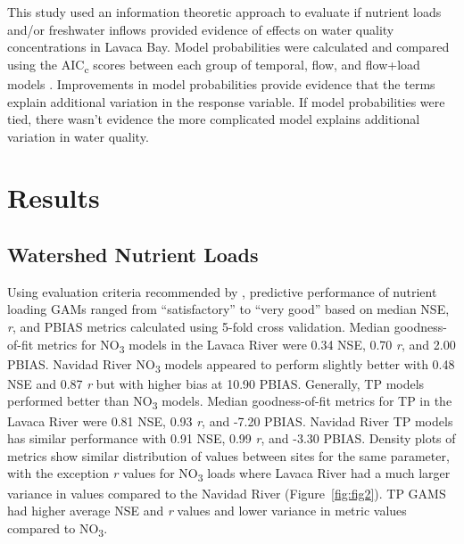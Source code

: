 \documentclass[sn-basic,referee,lineno,pdflatex]{sn-jnl}
\begin{document}
This study used an information theoretic approach to evaluate if
nutrient loads and/or freshwater inflows provided evidence of effects on
water quality concentrations in Lavaca Bay. Model probabilities were
calculated and compared using the AIC\textsubscript{c} scores between
each group of temporal, flow, and flow+load models
\citep{burnhamAICModelSelection2011}. Improvements in model
probabilities provide evidence that the terms explain additional
variation in the response variable. If model probabilities were tied,
there wasn't evidence the more complicated model explains additional
variation in water quality.

\hypertarget{sec3}{%
\section{Results}\label{sec3}}

\hypertarget{watershed-nutrient-loads}{%
\subsection{Watershed Nutrient Loads}\label{watershed-nutrient-loads}}

Using evaluation criteria recommended by
\citet{moriasiHydrologicWaterQuality2015}, predictive performance of
nutrient loading GAMs ranged from ``satisfactory'' to ``very good''
based on median NSE, \emph{r}, and PBIAS metrics calculated using 5-fold
cross validation. Median goodness-of-fit metrics for NO\textsubscript{3}
models in the Lavaca River were 0.34 NSE, 0.70 \emph{r}, and 2.00 PBIAS.
Navidad River NO\textsubscript{3} models appeared to perform slightly
better with 0.48 NSE and 0.87 \emph{r} but with higher bias at 10.90
PBIAS. Generally, TP models performed better than NO\textsubscript{3}
models. Median goodness-of-fit metrics for TP in the Lavaca River were
0.81 NSE, 0.93 \emph{r}, and -7.20 PBIAS. Navidad River TP models has
similar performance with 0.91 NSE, 0.99 \emph{r}, and -3.30 PBIAS.
Density plots of metrics show similar distribution of values between
sites for the same parameter, with the exception \emph{r} values for
NO\textsubscript{3} loads where Lavaca River had a much larger variance
in values compared to the Navidad River (Figure~\ref{fig:fig2}). TP GAMS
had higher average NSE and \emph{r} values and lower variance in metric
values compared to NO\textsubscript{3}.
\end{document}
